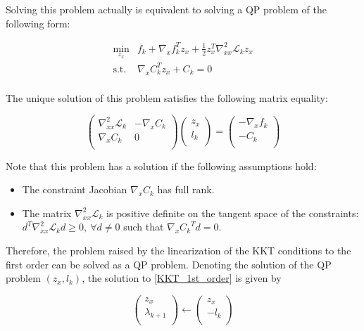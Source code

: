 Solving this problem actually is equivalent to solving a QP problem of the following form:

\begin{equation}
  \begin{array}{ll}
    \min_{z_x} &f_k + \nabla_x f_k ^T z_x + \frac{1}{2} z_x^T\nabla_{xx}^2\mathcal{L}_k z_x \\
    \text{s.t.} & \nabla_x C_k^T z_x + C_k = 0\\
  \end{array}
\end{equation}

The unique solution of this problem satisfies the following matrix equality:

\begin{equation}
  \begin{pmatrix}
      \nabla_{xx}^2\mathcal{L}_k & -\nabla_x C_k\\
      \nabla_x C_k & 0\\
  \end{pmatrix}
  \begin{pmatrix}
      z_x\\
      l_k\\
  \end{pmatrix}
  =
  \begin{pmatrix}
      - \nabla_{x}f_k\\
      - C_k\\
  \end{pmatrix}
\end{equation}

Note that this problem has a solution if the following assumptions hold:
\begin{itemize}
  \item The constraint Jacobian $\nabla_x C_k$ has full rank.
  \item The matrix $\nabla_{xx}^2\mathcal{L}_k$ is positive definite on the tangent space of the constraints:\\ $d^T\nabla_{xx}^2\mathcal{L}_k d \geq 0,\ \forall d\neq 0$ such that ${\nabla_x C_k}^T d = 0$.
\end{itemize}

Therefore, the problem raised by the linearization of the KKT conditions to the first order can be solved as a QP problem.
Denoting the solution of the QP problem $(z_x, l_k)$, the solution to \ref{KKT_1st_order} is given by

\begin{equation}
  \begin{pmatrix}
      z_x\\
      \lambda_{k+1}\\
  \end{pmatrix}
  \leftarrow
  \begin{pmatrix}
      z_x\\
      -l_k\\
  \end{pmatrix}
\end{equation}

